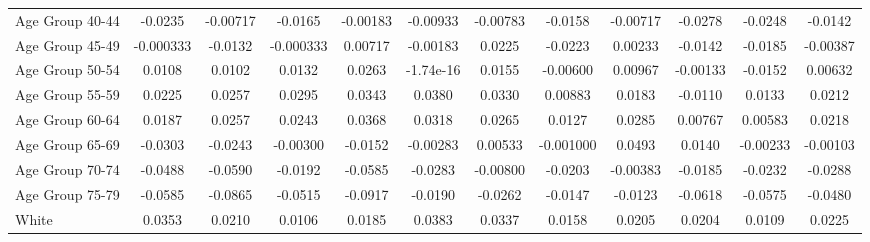 \begin{table}[htbp]
\begin{tabular}{l*{11}{c}}
Age Group 40-44     &     -0.0235         &    -0.00717         &     -0.0165         &    -0.00183         &    -0.00933         &    -0.00783         &     -0.0158         &    -0.00717         &     -0.0278\sym{*}  &     -0.0248         &     -0.0142\sym{*}  \\
Age Group 45-49     &   -0.000333         &     -0.0132         &   -0.000333         &     0.00717         &    -0.00183         &      0.0225         &     -0.0223         &     0.00233         &     -0.0142         &     -0.0185         &    -0.00387         \\
Age Group 50-54     &      0.0108         &      0.0102         &      0.0132         &      0.0263         &   -1.74e-16         &      0.0155         &    -0.00600         &     0.00967         &    -0.00133         &     -0.0152         &     0.00632         \\
Age Group 55-59     &      0.0225         &      0.0257         &      0.0295         &      0.0343         &      0.0380         &      0.0330         &     0.00883         &      0.0183         &     -0.0110         &      0.0133         &      0.0212\sym{**} \\
Age Group 60-64     &      0.0187         &      0.0257         &      0.0243         &      0.0368\sym{*}  &      0.0318         &      0.0265         &      0.0127         &      0.0285         &     0.00767         &     0.00583         &      0.0218\sym{***}\\
Age Group 65-69     &     -0.0303         &     -0.0243         &    -0.00300         &     -0.0152         &    -0.00283         &     0.00533         &   -0.001000         &      0.0493\sym{**} &      0.0140         &    -0.00233         &    -0.00103         \\
Age Group 70-74     &     -0.0488         &     -0.0590\sym{**} &     -0.0192         &     -0.0585\sym{**} &     -0.0283         &    -0.00800         &     -0.0203         &    -0.00383         &     -0.0185         &     -0.0232         &     -0.0288\sym{***}\\
Age Group 75-79     &     -0.0585\sym{*}  &     -0.0865\sym{***}&     -0.0515\sym{**} &     -0.0917\sym{***}&     -0.0190         &     -0.0262         &     -0.0147         &     -0.0123         &     -0.0618\sym{***}&     -0.0575\sym{***}&     -0.0480\sym{***}\\
White               &      0.0353\sym{*}  &      0.0210\sym{*}  &      0.0106         &      0.0185\sym{*}  &      0.0383\sym{***}&      0.0337\sym{***}&      0.0158         &      0.0205\sym{*}  &      0.0204\sym{**} &      0.0109         &      0.0225\sym{***}\\

\end{tabular}
\end{table}
